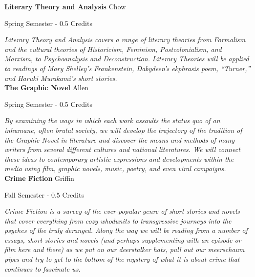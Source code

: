\noindent\textbf{Literary Theory and Analysis} \hfill Chow

\noindent Spring Semester - 0.5 Credits

\vspace{1mm}\emph{Literary Theory and Analysis covers a range of literary theories from Formalism and the cultural theories of Historicism, Feminism, Postcolonialism, and Marxism, to Psychoanalysis and Deconstruction. Literary Theories will be applied to readings of Mary Shelley’s Frankenstein, Dabydeen’s ekphrasis poem, ``Turner,'' and Haruki Murakami’s short stories. }\\

\noindent\textbf{The Graphic Novel} \hfill Allen

\noindent Spring Semester - 0.5 Credits

\vspace{1mm}\emph{By examining the ways in which each work assaults the status quo of an inhumane, often brutal society, we will develop the trajectory of the tradition of the Graphic Novel in literature and discover the means and methods of many writers from several different cultures and national literatures. We will connect these ideas to contemporary artistic expressions and developments within the media using film, graphic novels, music, poetry, and even viral campaigns. }\\

\noindent\textbf{Crime Fiction} \hfill Griffin

\noindent Fall Semester - 0.5 Credits

\vspace{1mm}\emph{Crime Fiction is a survey of the ever-popular genre of short stories and novels that cover everything from cozy whodunits to transgressive journeys into the psyches of the truly deranged. Along the way we will be reading from a number of essays, short stories and novels (and perhaps supplementing with an episode or film here and there) as we put on our deerstalker hats, pull out our meerschaum pipes and try to get to the bottom of the mystery of what it is about crime that continues to fascinate us.}\\

%
%

